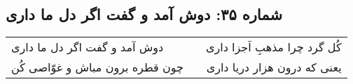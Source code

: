 \begin{center}
\section*{شماره ۳۵: دوش آمد و گفت اگر دل ما داری}
\label{sec:035}
\begin{longtable}{l p{0.5cm} r}
دوش آمد و گفت اگر دل ما داری
&&
کُل گرد چرا مذهبِ اَجزا داری
\\
چون قطره برون مباش و غوّاصی کُن
&&
یعنی که درون هزار دریا داری
\\
\end{longtable}
\end{center}
